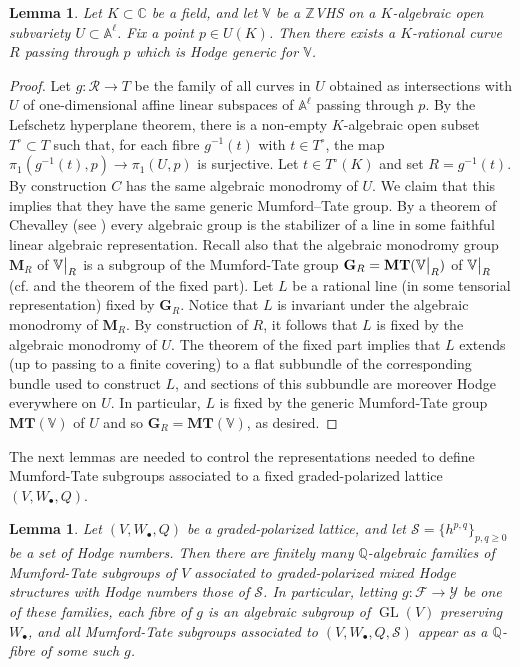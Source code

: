 \documentclass[10pt]{article}
\numberwithin{equation}{section}
\theoremstyle{plain}
\newtheorem{lem}[thm]{Lemma}
\theoremstyle{definition}
\theoremstyle{remark}
\newcommand\restr[2]{{
	\left.\kern-\nulldelimiterspace
	#1
	\vphantom{\big|}
	\right|_{#2}
	}}
\newcommand{\MT}{\mathbf{MT}}
\newcommand{\GL}{\operatorname{GL}}
\newcommand{\V}{\mathbb{V}}
\begin{document}
\begin{lem}
\label{genRlem}
Let $K \subset \mathbb{C}$ be a field, and let $\V$ be a $\mathbb{Z}$VHS on a $K$-algebraic open subvariety $U \subset \mathbb{A}^{\ell}$. Fix a point $p \in U(K)$. Then there exists a $K$-rational curve $R$ passing through $p$ which is Hodge generic for $\V$.
\end{lem}

\begin{proof}
Let $g : \mathcal{R} \to T$ be the family of all curves in $U$ obtained as intersections with $U$ of one-dimensional affine linear subspaces of $\mathbb{A}^{\ell}$ passing through $p$. By the Lefschetz hyperplane theorem, there is a non-empty $K$-algebraic open subset $T^{\circ} \subset T$ such that, for each fibre $g^{-1}(t)$ with $t \in T^{\circ}$, the map $\pi_1(g^{-1}(t), p) \to \pi_1(U, p)$ is surjective. Let $t\in T^{\circ}(K)$ and set $R=g^{-1}(t)$. By construction $C$ has the same algebraic monodromy of $U$. We claim that this implies that they have the same generic Mumford--Tate group. By a theorem of Chevalley (see \cite[Prop. 3.1]{zbMATH03853242}) every algebraic group is the stabilizer of a line in some faithful linear algebraic representation. Recall also that the algebraic monodromy group $\mathbf{M}_{R}$ of $\restr{\V}{R}$ is a subgroup of the Mumford-Tate group $\mathbf{G}_{R}=\MT(\restr{\V}{R})$ of $\restr{\V}{R}$ (cf. \cite[Thm. 1]{MR1154159} and the theorem of the fixed part). Let $L$ be a rational line (in some tensorial representation) fixed by $\mathbf{G}_R$. Notice that $L$ is invariant under the algebraic monodromy of $\mathbf{M}_R$. By construction of $R$, it follows that $L$ is fixed by the algebraic monodromy of $U$. The theorem of the fixed part implies that $L$ extends (up to passing to a finite covering) to a flat subbundle of the corresponding bundle used to construct $L$, and sections of this subbundle are moreover Hodge everywhere on $U$. In particular, $L$ is fixed by the generic Mumford-Tate group $\MT(\V)$ of $U$ and so $\mathbf{G}_R= \MT(\V)$, as desired.


\end{proof}


The next lemmas are needed to control the representations needed to define Mumford-Tate subgroups associated to a fixed graded-polarized lattice $(V, W_{\bullet}, Q)$.

\begin{lem}
\label{MTgroupfamlem}
Let $(V, W_{\bullet}, Q)$ be a graded-polarized lattice, and let $\mathcal{S} = \{ h^{p,q} \}_{p, q \geq 0}$ be a set of Hodge numbers. Then there are finitely many $\mathbb{Q}$-algebraic families of Mumford-Tate subgroups of $V$ associated to graded-polarized mixed Hodge structures with Hodge numbers those of $\mathcal{S}$. In particular, letting $g : \mathcal{F} \to \mathcal{Y}$ be one of these families, each fibre of $g$ is an algebraic subgroup of $\GL(V)$ preserving $W_{\bullet}$, and all Mumford-Tate subgroups associated to $(V, W_{\bullet}, Q, \mathcal{S})$ appear as a $\mathbb{Q}$-fibre of some such $g$.
\end{lem}
\end{document}
